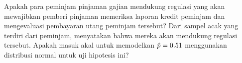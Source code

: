  

\begin{exercisewrap}
\begin{nexercise}
\label{paydayCC_conditions_gp}%
Apakah para peminjam pinjaman gajian mendukung regulasi
yang akan
  mewajibkan pemberi pinjaman memeriksa laporan kredit peminjam
  dan mengevaluasi pembayaran utang peminjam tersebut?
Dari sampel acak yang terdiri dari \paydayN{} peminjam,
\paydayCCPerc{} menyatakan bahwa mereka akan mendukung
regulasi tersebut.
Apakah masuk akal untuk memodelkan $\hat{p} = 0.51{}$
menggunakan distribusi normal
untuk uji hipotesis ini?\footnotemark
\end{nexercise}
\end{exercisewrap}
    
